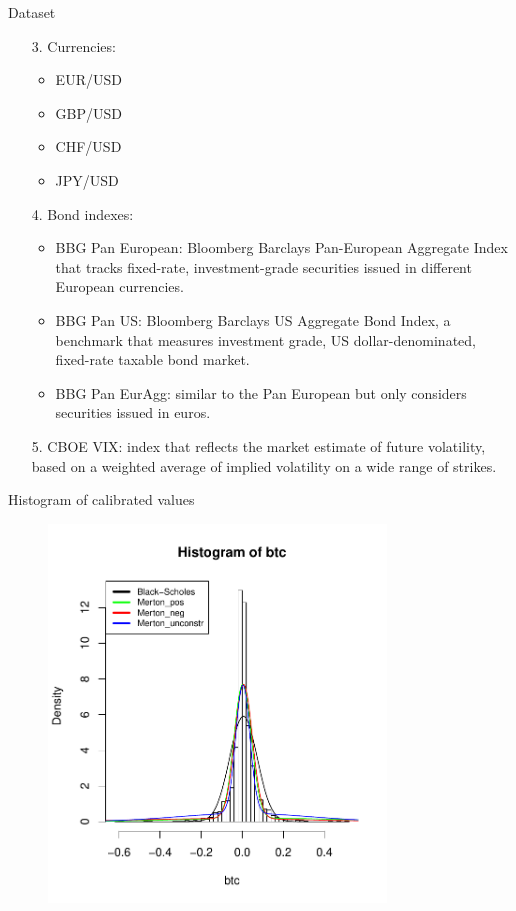 \documentclass{beamer}
\begin{document}
\begin{frame}{Dataset}
\begin{itemize}
\item[3.] Currencies:
	\begin{itemize}
	\item EUR/USD
	\item GBP/USD
	\item CHF/USD
	\item JPY/USD
	\end{itemize}
\item[4.] Bond indexes:
	\begin{itemize}
		\item BBG Pan European: Bloomberg Barclays Pan-European Aggregate Index that tracks fixed-rate, investment-grade securities issued in different European currencies.
		\item BBG Pan US: Bloomberg Barclays US Aggregate Bond Index, a benchmark that measures investment grade, US dollar-denominated, fixed-rate taxable bond market.
		\item BBG Pan EurAgg: similar to the Pan European but only considers securities issued in euros.
	\end{itemize}
\item[5.] CBOE VIX: index that reflects the market estimate of future volatility, based on a weighted average of implied volatility on a wide range of strikes. 
\end{itemize}
\end{frame}



\begin{frame}{Histogram of calibrated values}
\begin{figure}
\includegraphics[width=0.8\textwidth]{historgram_10percent.pdf}
\label{roll_stocks}
\end{figure}
\end{frame}
\end{document}
